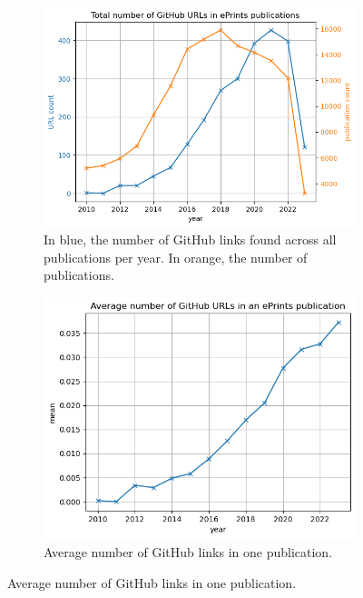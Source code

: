 \documentclass[10pt,a4paper]{scrartcl}
\begin{document}
\begin{figure}[h]
    \centering
    \begin{subfigure}[t]{0.3\textwidth}
        \centering
        \includegraphics[width=\textwidth]{../analysis/overall/github_in_eprints.png}
        \caption{In blue, the number of GitHub links found across all publications per year. In orange, the number of publications.}
        \label{fig:gh_in_ep_no}
    \end{subfigure}
    \hfill
    \begin{subfigure}[t]{0.3\textwidth}
        \centering
        \includegraphics[width=\textwidth]{../analysis/overall/avg_github_in_eprints.png}
        \caption{Average number of GitHub links in one publication.}
        \label{fig:gh_ep_mean}

\end{subfigure}
\end{figure}
\end{document}

